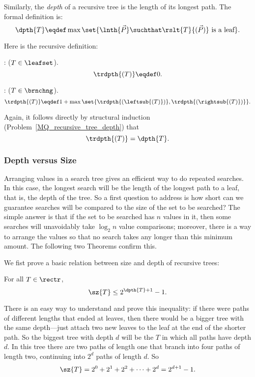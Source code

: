 \begin{definition}
Similarly, the \emph{depth}  of a recursive tree is
the length of its longest path.  The formal definition is:
\begin{equation}\label{defdepth}
\dpth{T} \eqdef \max \set{\lnth{\vec{P}} \suchthat
  \rslt{T}{(\vec{P})}\ \text{is a leaf}}.
\end{equation}

Here is the recursive definition:
\begin{definition}
: ($T \in \leafset$).
\[
\trdpth{(T)} \eqdef 0.
\]

: ($T \in\brnchng$).
\[
\trdpth{(T)} \eqdef 1+\max\set{\trdpth{(\leftsub{(T)})}, \trdpth{(\rightsub{(T)})}}.
\]
\end{definition}

Again, it follows directly by structural induction
(Problem~\ref{MQ_recursive_tree_depth}) that
\begin{equation}\label{recdepth=depth}
\trdpth{(T)} = \dpth{T}.
\end{equation}

\subsubsection{Depth versus Size}

Arranging values in a search tree gives an efficient way to do
repeated searches.  In this case, the longest search will be the
length of the longest path to a leaf, that is, the depth of the tree.
So a first question to address is how short can we guarantee searches
will be compared to the size of the set to be searched?  The simple
answer is that if the set to be searched has $n$ values in it, then
some searches will unavoidably take $\log_2 n$ value comparisons;
moreover, there is a way to arrange the values so that no search takes
any longer than this minimum amount.  The following two Theorems
confirm this.

We fist prove a basic relation between size and depth of recursive
trees:
\begin{theorem}\label{szT2d1}
For all $T \in \rectr$,
\begin{equation}\label{sT2d+1}
\sz{T} \leq 2^{\dpth{T}+1} - 1.
\end{equation}
\end{theorem}

There is an easy way to understand and prove this inequality: if
there were paths of different lengths that ended at leaves, then there
would be a bigger tree with the same depth---just attach two new
leaves to the leaf at the end of the shorter path.  So the biggest
tree with depth $d$ will be the  $T$ in which all
paths have depth $d$.  In this tree there are two paths of length one
that branch into four paths of length two, continuing into $2^d$ paths
of length $d$.  So
\[
\sz{T} = 2^0 + 2^1 + 2^2 + \cdots + 2^d = 2^{d+1}-1.
\]


\end{definition}
